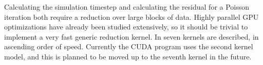 
Calculating the simulation timestep and calculating the residual for a Poisson iteration both require a reduction over large blocks of data.
Highly parallel GPU optimizations have already been studied extensively, so it should be trivial to implement a very fast generic reduction kernel.
In \cite{CUDAParallelReduction} seven kernels are described, in ascending order of speed.
Currently the CUDA program uses the second kernel model, and this is planned to be moved up to the seventh kernel in the future.
